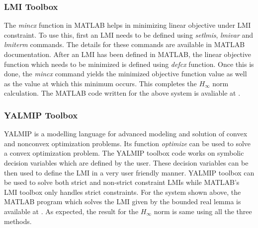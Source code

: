 \documentclass[a4paper,12pt]{article}
\begin{document}
		\subsubsection{LMI Toolbox} The \textit{mincx} function in MATLAB helps in minimizing linear objective under LMI constraint. To use this, first an LMI needs to be defined using \textit{setlmis}, \textit{lmivar} and \textit{lmiterm} commands. The details for these commands are available in MATLAB documentation. After an LMI has been defined in MATLAB, the linear objective function which needs to be minimized is defined using \textit{defcx} function. Once this is done, the \textit{mincx} command yields the minimized objective function value as well as the value at which this minimum occurs. This completes the $H_{\infty}$ norm calculation. The MATLAB code written for the above system is avaliable at \cite{git}. 
		\subsubsection{YALMIP Toolbox}
		YALMIP is a modelling language for advanced modeling and solution of convex and nonconvex optimization problems. Its function \textit{optimize} can be used to solve a convex optimization problem. The YALMIP toolbox code works on symbolic decision variables which are defined by the user. These decision variables can be then used to define the LMI in a very user friendly manner. YALMIP toolbox can be used to solve both strict and non-strict constraint LMIs while MATLAB's LMI toolbox only handles strict constraints. For the system shown above, the MATLAB program which solves the LMI given by the bounded real lemma is available at \cite{git}. As expected, the result for the $H_{\infty}$ norm is same using all the three methods.
\end{document}
